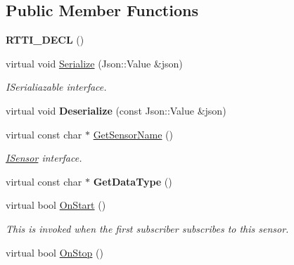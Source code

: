 \subsection*{Public Member Functions}
\begin{DoxyCompactItemize}
\item 
\mbox{\label{class_sonar_a2ca73026ac6a7368015804e9153f2eb2}} 
{\bfseries R\+T\+T\+I\+\_\+\+D\+E\+CL} ()
\item 
\mbox{\label{class_sonar_a82dc7b0b0472eaf9d6e8a20219ba8f51}} 
virtual void \hyperlink{class_sonar_a82dc7b0b0472eaf9d6e8a20219ba8f51}{Serialize} (Json\+::\+Value \&json)
\begin{DoxyCompactList}\small\item\em I\+Serialiazable interface. \end{DoxyCompactList}\item 
\mbox{\label{class_sonar_a1118991235f65dc3fecff8878955fc44}} 
virtual void {\bfseries Deserialize} (const Json\+::\+Value \&json)
\item 
\mbox{\label{class_sonar_abc5ce7d97d728b5f2ee701aed4a501f1}} 
virtual const char $\ast$ \hyperlink{class_sonar_abc5ce7d97d728b5f2ee701aed4a501f1}{Get\+Sensor\+Name} ()
\begin{DoxyCompactList}\small\item\em \hyperlink{class_i_sensor}{I\+Sensor} interface. \end{DoxyCompactList}\item 
\mbox{\label{class_sonar_a6705198785986d06b0132d10adf9bf99}} 
virtual const char $\ast$ {\bfseries Get\+Data\+Type} ()
\item 
\mbox{\label{class_sonar_a19cfe2b07138b6c9edede1415b19b593}} 
virtual bool \hyperlink{class_sonar_a19cfe2b07138b6c9edede1415b19b593}{On\+Start} ()
\begin{DoxyCompactList}\small\item\em This is invoked when the first subscriber subscribes to this sensor. \end{DoxyCompactList}\item 
\mbox{\label{class_sonar_ac3c8e5369e2fc92efaf30a2ffc6a7103}} 
virtual bool \hyperlink{class_sonar_ac3c8e5369e2fc92efaf30a2ffc6a7103}{On\+Stop} ()

\end{DoxyCompactItemize}
